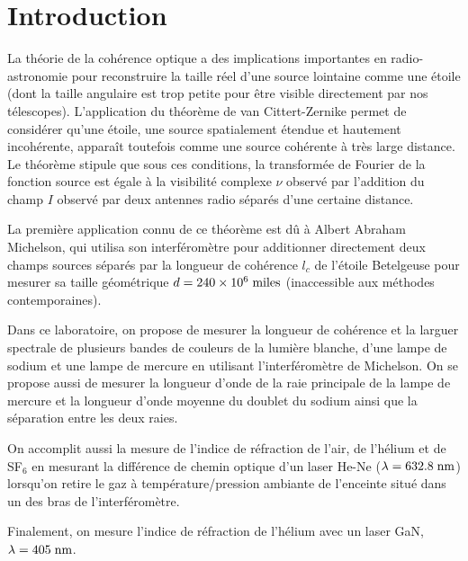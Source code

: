 \documentclass[10pt,letterpaper,twocolumn]{article}
\newcommand{\s}{\hspace{0.1cm}}
\begin{document}
\section{Introduction}\label{intro} %
La théorie de la cohérence optique a des implications importantes en radio-astronomie pour reconstruire la taille réel d'une source lointaine comme une étoile (dont la taille angulaire est trop petite pour être visible directement par nos télescopes). L'application du théorème de van Cittert-Zernike permet de considérer qu'une étoile, une source spatialement étendue et hautement incohérente, apparaît toutefois comme une source cohérente à très large distance. Le théorème stipule que sous ces conditions, la transformée de Fourier de la fonction source est égale à la visibilité complexe $\nu$ observé par l'addition du champ $I$ observé par deux antennes radio séparés d'une certaine distance. \par
La première application connu de ce théorème est dû à Albert Abraham Michelson, qui utilisa son interféromètre pour additionner directement deux champs sources séparés par la longueur de cohérence $l_c$ de l'étoile Betelgeuse pour mesurer sa taille géométrique ${d = 240\times 10^6\s \text{miles}}$\supercite{Michelson1921} (inaccessible aux méthodes contemporaines). \par
Dans ce laboratoire, on propose de mesurer la longueur de cohérence et la larguer spectrale de plusieurs bandes de couleurs de la lumière blanche, d'une lampe de sodium et une lampe de mercure en utilisant l'interféromètre de Michelson. On se propose aussi de mesurer la longueur d'onde de la raie principale de la lampe de mercure et la longueur d'onde moyenne du doublet du sodium ainsi que la séparation entre les deux raies.\par
On accomplit aussi la mesure de l'indice de réfraction de l'air, de l'hélium et de SF$_6$ en mesurant la différence de chemin optique d'un laser He-Ne ($\lambda = 632.8\s \text{nm}$) lorsqu'on retire le gaz à température/pression ambiante de l'enceinte situé dans un des bras de l'interféromètre. \par
Finalement, on mesure l'indice de réfraction de l'hélium avec un laser GaN, $\lambda = 405\s \text{nm}$.
\end{document}
